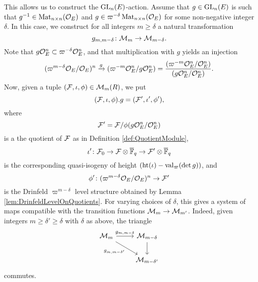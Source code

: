 \documentclass[../main.tex]{subfiles}
\begin{document}
This allows us to construct the $\operatorname{GL}_n(E)$-action. Assume that $g \in \operatorname{GL}_n(E)$ is such that $g^{-1} \in \operatorname{Mat}_{n\times
n}(\mathcal{O}_E)$ and $g \in \varpi^{-\delta} \operatorname{Mat}_{n \times n}(\mathcal{O}_E)$ for some non-negative
integer $\delta$. In this case, we construct for all integers $m \geq \delta$ a natural
transformation
\begin{equation*}
  g_{m, m-\delta}\colon \mathcal{M}_m \to \mathcal{M}_{m-\delta}.
\end{equation*}
Note that $g \mathcal{O}_E^n \subset \varpi^{-\delta} \mathcal{O}_E^n$, and that multiplication with
$g$ yields an injection
\begin{equation*}
  (\varpi^{m-\delta}\mathcal{O}_E/\mathcal{O}_E)^n \xrightarrow{g} (\varpi^{-m}\mathcal{O}_E^n/g\mathcal{O}_E^n) = 
  \frac{(\varpi^{-m} \mathcal{O}_E^n /\mathcal{O}_E^n)}{(g \mathcal{O}_E^n/\mathcal{O}_E^n)}.
\end{equation*}
Now, given a tuple $(\mathcal{F}, \iota, \phi) \in \mathcal{M}_m(R)$, we put $$(\mathcal{F}, \iota, \phi).g = (\mathcal{F}', \iota', \phi'),$$ where 
$$\mathcal{F}'= \mathcal{F}/\phi(g\mathcal{O}_E^n/\mathcal{O}_E^n)$$ 
is a the quotient of $\mathcal{F}$ as in Definition \ref{def:QuotientModule}, 
$$\iota'\colon \mathcal{F}_0 \to \mathcal{F} \otimes \overline {\mathbb{F}}_q \to \mathcal{F}' \otimes \overline {\mathbb{F}}_q$$ 
is the corresponding quasi-isogeny of height 
$(\textnormal{ht}(\iota) - \mathrm{val}_\varpi( \det g))$, and 
$$\phi'\colon (\varpi^{m-\delta}\mathcal{O}_E/\mathcal{O}_E)^n \to \mathcal{F}'$$ 
is the Drinfeld $\varpi^{m-\delta}$ level structure obtained by Lemma
\ref{lem:DrinfeldLevelOnQuotients}. 
For varying choices of $\delta$, this gives a system of maps compatible with the 
transition functions $\mathcal{M}_m \to \mathcal{M}_{m'}$. Indeed, given integers $m \geq \delta'
\geq \delta$ with $\delta$ as above, the triangle 
\begin{equation*}
\begin{tikzcd}[ampersand replacement=\&]
	{\cM_{m}} \& {\cM_{m-\delta}} \\
	\& {\cM_{m-\delta'}}
	\arrow["{g_{m,m-\delta}}", from=1-1, to=1-2]
	\arrow["{g_{m,m-\delta'}}"', from=1-1, to=2-2]
	\arrow[from=1-2, to=2-2]
\end{tikzcd}
\end{equation*}
commutes.
\end{document}
